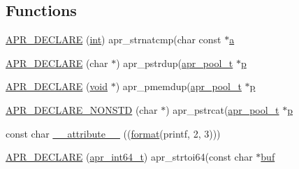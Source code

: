 \subsection*{Functions}
\begin{DoxyCompactItemize}
\item 
\hyperlink{group__apr__strings_gad294ac1597b7ef2e799d42be2aebd407}{A\+P\+R\+\_\+\+D\+E\+C\+L\+A\+RE} (\hyperlink{pcre_8txt_a42dfa4ff673c82d8efe7144098fbc198}{int}) apr\+\_\+strnatcmp(char const $\ast$\hyperlink{pcre_8txt_a841271aab70f5cda9412a19c7753f02c}{a}
\item 
\hyperlink{group__apr__strings_ga46c098340ca16c99fa759f213596ea4c}{A\+P\+R\+\_\+\+D\+E\+C\+L\+A\+RE} (char $\ast$) apr\+\_\+pstrdup(\hyperlink{structapr__pool__t}{apr\+\_\+pool\+\_\+t} $\ast$\hyperlink{group__APACHE__CORE__MPM_ga5cd91701e5c167f2b1a38e70ab57817e}{p}
\item 
\hyperlink{group__apr__strings_ga6cbdbfc3228801b7ae7b07ac7d90b82b}{A\+P\+R\+\_\+\+D\+E\+C\+L\+A\+RE} (\hyperlink{group__MOD__ISAPI_gacd6cdbf73df3d9eed42fa493d9b621a6}{void} $\ast$) apr\+\_\+pmemdup(\hyperlink{structapr__pool__t}{apr\+\_\+pool\+\_\+t} $\ast$\hyperlink{group__APACHE__CORE__MPM_ga5cd91701e5c167f2b1a38e70ab57817e}{p}
\item 
\hyperlink{group__apr__strings_ga832025175d31b508bbb7f2ae2c86b40c}{A\+P\+R\+\_\+\+D\+E\+C\+L\+A\+R\+E\+\_\+\+N\+O\+N\+S\+TD} (char $\ast$) apr\+\_\+pstrcat(\hyperlink{structapr__pool__t}{apr\+\_\+pool\+\_\+t} $\ast$\hyperlink{group__APACHE__CORE__MPM_ga5cd91701e5c167f2b1a38e70ab57817e}{p}
\item 
const char \hyperlink{group__apr__strings_ga44bb214856b287cad23bb7a57bbdd7ac}{\+\_\+\+\_\+attribute\+\_\+\+\_\+} ((\hyperlink{group__apr__time_ga6427c3237144d9709aa13825289f0b78}{format}(printf, 2, 3)))
\item 
\hyperlink{group__apr__strings_ga51f9a4b11c74398accfa0fb5f880c9ee}{A\+P\+R\+\_\+\+D\+E\+C\+L\+A\+RE} (\hyperlink{group__apr__platform_ga4b75afbf973dc6c8aea4ae75b044aa08}{apr\+\_\+int64\+\_\+t}) apr\+\_\+strtoi64(const char $\ast$\hyperlink{group__APR__Util__Bucket__Brigades_gae92da6cbed6002407731bd51f7c6b984}{buf}
\end{DoxyCompactItemize}
